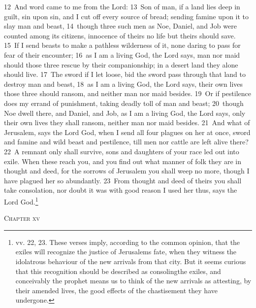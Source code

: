 \documentclass[10pt]{book} %
\begin{document}
\textcolor{benred8}{12}~And word came to me from the Lord: \textcolor{benred8}{13}~Son of man, if a land lies deep in guilt, sin upon sin, and I cut off every source of bread; sending famine upon it to slay man and beast, \textcolor{benred8}{14}~though three such men as Noe, Daniel, and Job were counted among its citizens, innocence of theirs no life but theirs should save. \textcolor{benred8}{15}~If I send beasts to make a pathless wilderness of it, none daring to pass for fear of their encounter; \textcolor{benred8}{16}~as I am a living God, the Lord says, man nor maid should those three rescue by their companionship; in a desert land they alone should live. \textcolor{benred8}{17}~The sword if I let loose, bid the sword pass through that land to destroy man and beast, \textcolor{benred8}{18}~as I am a living God, the Lord says, their own lives those three should ransom, and neither man nor maid besides. \textcolor{benred8}{19}~Or if pestilence does my errand of punishment, taking deadly toll of man and beast; \textcolor{benred8}{20}~though Noe dwell there, and Daniel, and Job, as I am a living God, the Lord says, only their own lives they shall ransom, neither man nor maid besides. \textcolor{benred8}{21}~And what of Jerusalem, says the Lord God, when I send all four plagues on her at once, sword and famine and wild beast and pestilence, till men nor cattle are left alive there? \textcolor{benred8}{22}~A remnant only shall survive, sons and daughters of your race led out into exile. When these reach you, and you find out what manner of folk they are in thought and deed, for the sorrows of Jerusalem you shall weep no more, though I have plagued her so abundantly. \textcolor{benred8}{23}~From thought and deed of theirs you shall take consolation, nor doubt it was with good reason I used her thus, says the Lord God.\footnote[3]{vv. 22, 23. These verses imply, according to the common opinion, that the exiles will recognize the justice of Jerusalem\textquotesingle s fate, when they witness the idolatrous behaviour of the new arrivals from that city. But it seems curious that this recognition should be described as \textasciigrave consoling\textquotesingle  the exiles, and conceivably the prophet means us to think of the new arrivals as attesting, by their amended lives, the good effects of the chastisement they have undergone.}
\begin{large}\begin{center}\textsc{Chapter xv}\end{center}\end{large}
\end{document}
